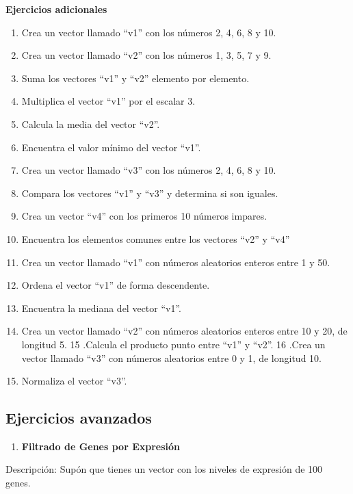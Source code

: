 \documentclass[
]{book}
\providecommand{\tightlist}{%
  \setlength{\itemsep}{0pt}\setlength{\parskip}{0pt}}
\begin{document}
\textbf{Ejercicios adicionales }

\begin{enumerate}
\def\labelenumi{\arabic{enumi}.}
\tightlist
\item
  Crea un vector llamado ``v1'' con los números 2, 4, 6, 8 y 10.
\item
  Crea un vector llamado ``v2'' con los números 1, 3, 5, 7 y 9.
\item
  Suma los vectores ``v1'' y ``v2'' elemento por elemento.
\item
  Multiplica el vector ``v1'' por el escalar 3.
\item
  Calcula la media del vector ``v2''.
\item
  Encuentra el valor mínimo del vector ``v1''.
\item
  Crea un vector llamado ``v3'' con los números 2, 4, 6, 8 y 10.
\item
  Compara los vectores ``v1'' y ``v3'' y determina si son iguales.
\item
  Crea un vector ``v4'' con los primeros 10 números impares.
\item
  Encuentra los elementos comunes entre los vectores ``v2'' y ``v4''
\item
  Crea un vector llamado ``v1'' con números aleatorios enteros entre 1 y 50.
\item
  Ordena el vector ``v1'' de forma descendente.
\item
  Encuentra la mediana del vector ``v1''.
\item
  Crea un vector llamado ``v2'' con números aleatorios enteros entre 10 y 20, de longitud 5.
  15 .Calcula el producto punto entre ``v1'' y ``v2''.
  16 .Crea un vector llamado ``v3'' con números aleatorios entre 0 y 1, de longitud 10.
\item
  Normaliza el vector ``v3''.
\end{enumerate}

\subsection{Ejercicios avanzados}\label{ejercicios-avanzados}

\begin{enumerate}
\def\labelenumi{\arabic{enumi}.}
\tightlist
\item
  \textbf{Filtrado de Genes por Expresión}
\end{enumerate}

Descripción: Supón que tienes un vector con los niveles de expresión de 100 genes.
\end{document}
